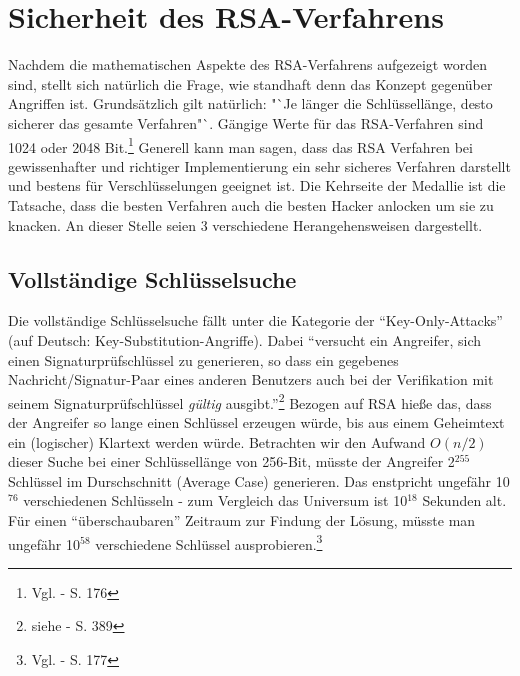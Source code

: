 \section{Sicherheit des RSA-Verfahrens}
Nachdem die mathematischen Aspekte des RSA-Verfahrens aufgezeigt worden sind,
stellt sich natürlich die Frage, wie standhaft denn das Konzept gegenüber
Angriffen ist. Grundsätzlich gilt natürlich: "`Je länger die Schlüssellänge,
desto sicherer das gesamte Verfahren"`. Gängige Werte für das RSA-Verfahren sind
1024 oder 2048 Bit.\footnote{Vgl. \cite{KryptoIX} - S. 176} Generell kann man
sagen, dass das RSA Verfahren bei gewissenhafter und richtiger Implementierung
ein sehr sicheres Verfahren darstellt und bestens für Verschlüsselungen geeignet
ist. Die Kehrseite der Medallie ist die Tatsache, dass die besten Verfahren auch
die besten Hacker anlocken um sie zu knacken. An dieser Stelle seien 3
verschiedene Herangehensweisen dargestellt.
\subsection{Vollständige Schlüsselsuche}
Die vollständige Schlüsselsuche fällt unter die Kategorie der
"`Key-Only-Attacks"' (auf Deutsch: Key-Substitution-Angriffe). Dabei "`versucht
ein Angreifer, sich einen Signaturprüfschlüssel zu generieren, so dass ein
gegebenes Nachricht/Signatur-Paar eines anderen Benutzers auch bei der
Verifikation mit seinem Signaturprüfschlüssel \textit{gültig}
ausgibt."'\footnote{siehe \cite{SpringerKey} - S. 389} Bezogen auf RSA hieße
das, dass der Angreifer so lange einen Schlüssel erzeugen würde, bis aus einem
Geheimtext ein (logischer) Klartext werden würde. Betrachten wir den Aufwand
$O(n/2)$ dieser Suche bei einer Schlüssellänge von 256-Bit, müsste der Angreifer
2$^{255}$ Schlüssel im Durschschnitt (Average Case) generieren. Das
enstpricht ungefähr 10$^{76}$ verschiedenen Schlüsseln - zum Vergleich das
Universum ist 10$^{18}$ Sekunden alt. Für einen "`überschaubaren"' Zeitraum zur
Findung der Lösung, müsste man ungefähr 10$^{58}$ verschiedene Schlüssel
ausprobieren.\footnote{Vgl. \cite{KryptoIX} - S. 177}
